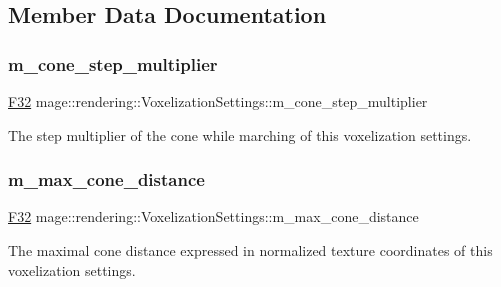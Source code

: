 \subsection{Member Data Documentation}
\hypertarget{classmage_1_1rendering_1_1_voxelization_settings_a4d58d4ab9b43d2631415da65321a8c83}{}\label{classmage_1_1rendering_1_1_voxelization_settings_a4d58d4ab9b43d2631415da65321a8c83} 
\subsubsection{\texorpdfstring{m\+\_\+cone\+\_\+step\+\_\+multiplier}{m\_cone\_step\_multiplier}}
{\footnotesize\ttfamily \hyperlink{namespacemage_aa97e833b45f06d60a0a9c4fc22ae02c0}{F32} mage\+::rendering\+::\+Voxelization\+Settings\+::m\+\_\+cone\+\_\+step\+\_\+multiplier\hspace{0.3cm}{\ttfamily [private]}}

The step multiplier of the cone while marching of this voxelization settings. \hypertarget{classmage_1_1rendering_1_1_voxelization_settings_adb6172810eba8f59553bcbb9e2a7cbe3}{}\label{classmage_1_1rendering_1_1_voxelization_settings_adb6172810eba8f59553bcbb9e2a7cbe3} 
\subsubsection{\texorpdfstring{m\+\_\+max\+\_\+cone\+\_\+distance}{m\_max\_cone\_distance}}
{\footnotesize\ttfamily \hyperlink{namespacemage_aa97e833b45f06d60a0a9c4fc22ae02c0}{F32} mage\+::rendering\+::\+Voxelization\+Settings\+::m\+\_\+max\+\_\+cone\+\_\+distance\hspace{0.3cm}{\ttfamily [private]}}

The maximal cone distance expressed in normalized texture coordinates of this voxelization settings. \hypertarget{classmage_1_1rendering_1_1_voxelization_settings_a14a93b638fced273f7beab95c1caf929}{}\label{classmage_1_1rendering_1_1_voxelization_settings_a14a93b638fced273f7beab95c1caf929} 
